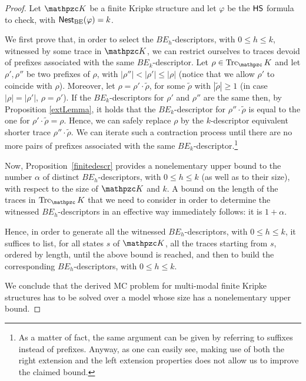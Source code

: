 \begin{proof}
Let $\Ku$ be a finite Kripke structure and let $\varphi$ be the $\text{\sffamily HS}$ formula to check, with $\operatorname{\mathsf{Nest}_{BE}}(\varphi) = k$. 

We first prove that, in order to select the $BE_h$-descriptors, with $0\leq h\leq k$, witnessed by some trace in $\Ku$,
we can restrict ourselves to traces devoid of prefixes associated with the same $BE_k$-descriptor.
%
Let $\rho \in \Trk_\Ku$ and let $\rho', \rho''$ be two prefixes of $\rho$, with 
$|\rho''|<|\rho'| \leq |\rho|$ (notice that we allow $\rho'$ to coincide with $\rho$).
Moreover, let $\rho = \rho' \cdot \tilde{\rho}$, for some $\tilde{\rho}$ with 
$|\tilde{\rho}| \geq 1$ (in case $|\rho| = |\rho'|$, $\rho = \rho'$).
If the $BE_k$-descriptors for $\rho'$ and $\rho''$ are the same then, by Proposition \ref{extLemma},
it holds that the $BE_k$-descriptor for $\rho'' \cdot \tilde{\rho}$ is equal to the one for 
$\rho' \cdot \tilde{\rho} = \rho$. Hence, we can safely replace $\rho$ by the $k$-descriptor equivalent 
shorter trace $\rho'' \cdot \tilde{\rho}$. 
%
We can iterate such a contraction process until there are no more pairs of prefixes associated with the same 
$BE_k$-descriptor.\footnote{As a matter of fact, the same argument can be given by referring to
suffixes instead of prefixes. Anyway, as one can easily see, making use of both the right extension 
and the left extension properties does not allow us to improve the claimed bound.}

Now, Proposition~\ref{finitedescr} provides a nonelementary upper bound to the number $\alpha$ of distinct 
$BE_h$-descriptors, with $0\leq h\leq k$ (as well as to their size), with 
respect to the size of $\Ku$ and $k$. 
%
A bound on the length of the traces in $\Trk_\Ku$ that we need to consider in order
to determine the witnessed $BE_h$-descriptors
in an effective way immediately follows: it is $1+\alpha$. 

Hence, in order to generate all the witnessed $BE_h$-descriptors, with $0\leq h\leq k$, it suffices
to list, for all states $s$ of $\Ku$, all the traces starting from $s$, ordered by length,
until the above bound is reached, and then to build the corresponding $BE_h$-descriptors, with 
$0\leq h\leq k$.

We conclude that the derived MC problem for multi-modal finite Kripke 
structures has to be solved over a model whose size has a nonelementary upper bound.
\end{proof}

